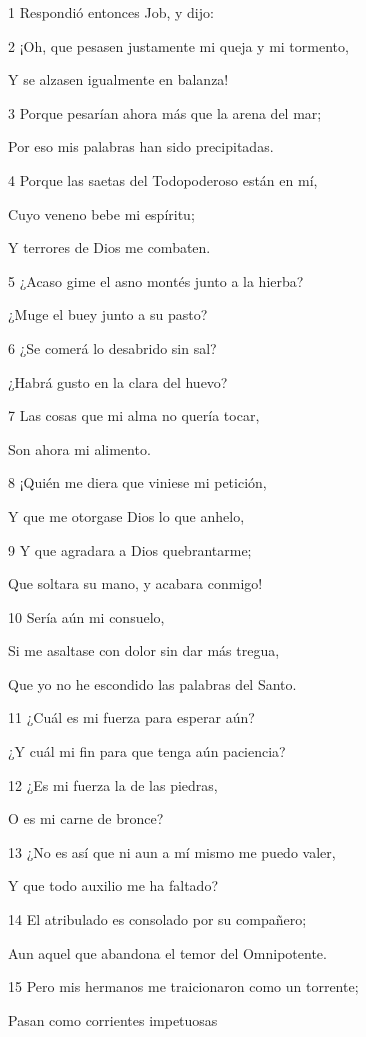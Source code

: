 \par 1 Respondió entonces Job, y dijo:
\par 2 ¡Oh, que pesasen justamente mi queja y mi tormento,
\par Y se alzasen igualmente en balanza!
\par 3 Porque pesarían ahora más que la arena del mar;
\par Por eso mis palabras han sido precipitadas.
\par 4 Porque las saetas del Todopoderoso están en mí,
\par Cuyo veneno bebe mi espíritu;
\par Y terrores de Dios me combaten.
\par 5 ¿Acaso gime el asno montés junto a la hierba?
\par ¿Muge el buey junto a su pasto?
\par 6 ¿Se comerá lo desabrido sin sal?
\par ¿Habrá gusto en la clara del huevo?
\par 7 Las cosas que mi alma no quería tocar,
\par Son ahora mi alimento.
\par 8 ¡Quién me diera que viniese mi petición,
\par Y que me otorgase Dios lo que anhelo,
\par 9 Y que agradara a Dios quebrantarme;
\par Que soltara su mano, y acabara conmigo! 
\par 10 Sería aún mi consuelo,
\par Si me asaltase con dolor sin dar más tregua,
\par Que yo no he escondido las palabras del Santo.
\par 11 ¿Cuál es mi fuerza para esperar aún?
\par ¿Y cuál mi fin para que tenga aún paciencia? 
\par 12 ¿Es mi fuerza la de las piedras,
\par O es mi carne de bronce?
\par 13 ¿No es así que ni aun a mí mismo me puedo valer,
\par Y que todo auxilio me ha faltado?
\par 14 El atribulado es consolado por su compañero;
\par Aun aquel que abandona el temor del Omnipotente. 
\par 15 Pero mis hermanos me traicionaron como un torrente;
\par Pasan como corrientes impetuosas
